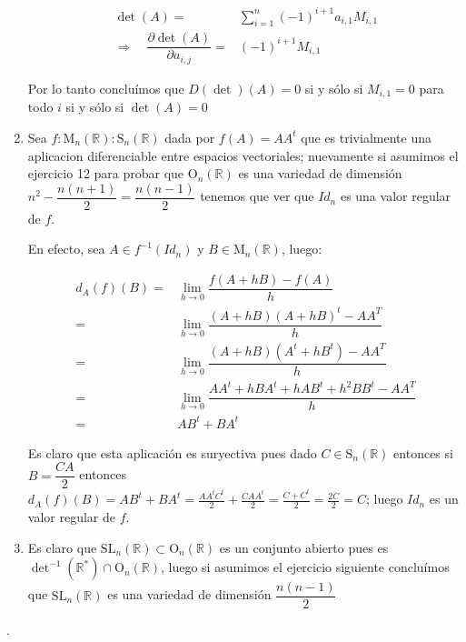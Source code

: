 \documentclass[11pt]{article}
\newcommand{\R}{{\mathbb{R}}}
\numberwithin{theorem}{subsection}
\newcommand{\qed}{\nobreak \ifvmode \relax \else
	\ifdim\lastskip<1.5em \hskip-\lastskip
	\hskip1.5em plus0em minus0.5em \fi \nobreak
	\vrule height0.75em width0.5em depth0.25em\fi}
\begin{document}
\begin{solution}
\begin{enumerate}
		\begin{equation*}
			\begin{aligned}
				\det (A) = & \sum_{i=1}^{n}{(-1)^{i+1}a_{i,1}M_{i,1}} \\
				\Longrightarrow \quad \dfrac{\partial \det (A)}{\partial a_{i,j}} = & {(-1)^{i+1}M_{i,1}}
			\end{aligned}
		\end{equation*}
		
		Por lo tanto conclu\'imos que $D(\det)(A) = 0$ si y s\'olo si $M_{i,1} = 0$ para todo $i$ si y s\'olo si $\det (A) = 0$
		
		\item Sea $f:  \mathrm{M}_n(\R) :  \mathrm{S}_n(\R)$ dada por $f(A) = AA^t$ que es trivialmente una aplicacion diferenciable entre espacios vectoriales; nuevamente si asumimos el ejercicio 12 para probar que $ \mathrm{O}_n(\R)$ es una variedad de dimensi\'on $n^2 - \dfrac{n(n+1)}{2} = \dfrac{n(n-1)}{2}$ tenemos que ver que $Id_n$ es una valor regular de $f$.
		
		En efecto, sea $A \in f^{-1}(Id_n)$ y $B \in  \mathrm{M}_n(\R)$, luego:
		
		\begin{equation*}
			\begin{aligned}
				d_A(f)(B) = & \lim\limits_{h \rightarrow 0 }{\dfrac{f(A+hB) - f(A)}{h}} \\
				= & \lim\limits_{h \rightarrow 0 }{\dfrac{(A+hB)(A+hB)^t - AA^T}{h}} \\
				= & \lim\limits_{h \rightarrow 0 }{\dfrac{(A+hB)(A^t+hB^t) - AA^T}{h}} \\
				= & \lim\limits_{h \rightarrow 0 }{\dfrac{AA^t+hBA^t + hAB^t + h^2BB^t - AA^T}{h}} \\
				= & AB^t + BA^t
			\end{aligned}
		\end{equation*}
		
		Es claro que esta aplicaci\'on es suryectiva pues dado $C \in \mathrm{S}_n(\R)$ entonces si $B = \dfrac{CA}{2}$ entonces $d_A(f)(B) = AB^t + BA^t = \frac{AA^tC^t}{2} + \frac{CAA^t}{2} = \frac{C+C^t}{2} = \frac{2C}{2} = C$; luego $Id_n$ es un valor regular de $f$.
		
		\item Es claro que $\mathrm{SL}_n(\R) \subset \mathrm{O}_n(\R)$ es un conjunto abierto pues es $\det^{-1}(\R^{\ast}) \cap \mathrm{O}_n(\R)$, luego si asumimos el ejercicio siguiente conclu\'imos que $\mathrm{SL}_n(\R)$ es una variedad de dimensi\'on $\dfrac{n(n-1)}{2}$
		
	\end{enumerate}
	.\qed
	
\end{solution}
\end{document}
